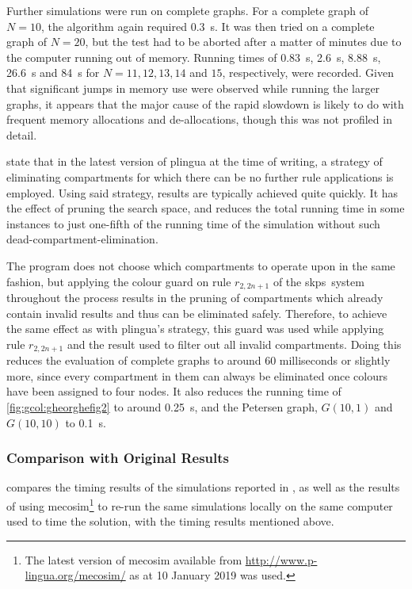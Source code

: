 Further simulations were run on complete graphs.  For a complete graph of \(N = 10\), the algorithm again required \qty{0.3}{\second}.  It was then tried on a complete graph of \(N = 20\), but the test had to be aborted after a matter of minutes due to the computer running out of memory.  Running times of \qty{0.83}{\second}, \qty{2.6}{\second}, \qty{8.88}{\second}, \qty{26.6}{\second} and \qty{84}{\second} for \(N = 11, 12, 13, 14\) and \(15\), respectively, were recorded.  Given that significant jumps in memory use were observed while running the larger graphs, it appears that the major cause of the rapid slowdown is likely to do with frequent \adhoc{} memory allocations and de-allocations, though this was not profiled in detail.

\citeauthor{Gheorghe2013} state \cite[p.~828]{Gheorghe2013} that in the latest version of \gls{plingua} at the time of writing, a strategy of eliminating \glspl{compartment} for which there can be no further rule applications is employed.  Using said strategy, results are typically achieved quite quickly.  It has the effect of pruning the search space, and reduces the total running time in some instances to just one-fifth of the running time of the simulation without such dead-\gls{compartment}-elimination.

The \fsharp{} program does not choose which \glspl{compartment} to operate upon in the same fashion, but applying the colour guard on rule \(r_{2,2n+1}\) of the \gls{skps}~system throughout the process results in the pruning of \glspl{compartment} which already contain invalid results and thus can be eliminated safely. Therefore, to achieve the same effect as with \gls{plingua}'s strategy, this guard was used while applying rule \(r_{2,2n+1}\) and the result used to filter out all invalid \glspl{compartment}.  Doing this reduces the evaluation of complete graphs to around 60 milliseconds or slightly more, since every \gls{compartment} in them can always be eliminated once colours have been assigned to four nodes.  It also reduces the running time of \cref{fig:gcol:gheorghefig2} to around \qty{0.25}{\second}, and the Petersen graph, \(G(10,1)\) and \(G(10,10)\) to \qty{0.1}{\second}.

\subsubsection{Comparison with Original Results}

 compares the timing results of the simulations reported in \cite{Gheorghe2013}, as well as the results of using \gls{mecosim}\footnote{The latest version of \gls{mecosim} available from \url{http://www.p-lingua.org/mecosim/} as at 10 January 2019 was used.} \cite{Perez-Hurtado2010} to re-run the same simulations locally on the same computer used to time the \fsharp{} solution, with the timing results mentioned above.


